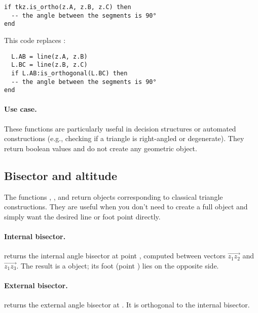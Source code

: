 \begin{mybox}
\begin{verbatim}
if tkz.is_ortho(z.A, z.B, z.C) then
  -- the angle between the segments is 90°
end
\end{verbatim}
\end{mybox}

This code replaces :

\begin{mybox}
\begin{verbatim}
  L.AB = line(z.A, z.B)
  L.BC = line(z.B, z.C)
  if L.AB:is_orthogonal(L.BC) then
  -- the angle between the segments is 90°
end
\end{verbatim}
\end{mybox}

\paragraph{Use case.}
These functions are particularly useful in decision structures or automated constructions (e.g., checking if a triangle is right-angled or degenerate). They return boolean values and do not create any geometric object.

\subsection{Bisector and altitude}
\label{sub:bisector_and_altitude}

The functions , , and  return  objects corresponding to classical triangle constructions. They are useful when you don't need to create a full  object and simply want the desired line or foot point directly.

\paragraph{Internal bisector.}
 returns the internal angle bisector at point , computed between vectors $\overrightarrow{z_1z_2}$ and $\overrightarrow{z_1z_3}$. The result is a  object; its foot (point ) lies on the opposite side.

\paragraph{External bisector.}
 returns the external angle bisector at . It is orthogonal to the internal bisector.

